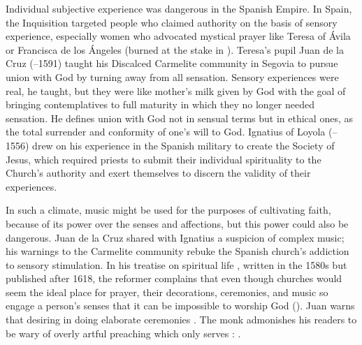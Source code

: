 Individual subjective experience was dangerous in the Spanish Empire.
In Spain, the Inquisition targeted people who claimed authority on the basis of
sensory experience, especially women who advocated mystical prayer like Teresa
of Ávila or Francisca de los Ángeles (burned at the stake in ).
    \Autocites
    {Ahlgren:TeresaPolitics}
    {Francisca:Inquisition}
    [, \XXX]{Schreiner:Certainty}
Teresa's pupil Juan de la Cruz (--1591) taught his Discalced
Carmelite community in Segovia to pursue union with God by turning away from
all sensation.
Sensory experiences were real, he taught, but they were like mother's milk
given by God with the goal of bringing contemplatives to full maturity in which
they no longer needed sensation.
He defines union with God not in sensual terms but in ethical ones, as the
total surrender and conformity of one's will to God.%
    \Autocite
    [, , ]
    {JuandelaCruz:Subida}
Ignatius of Loyola (--1556) drew on his experience in the Spanish
military to create the Society of Jesus, which required priests to submit their
individual spirituality to the Church's authority and exert themselves to
discern the validity of their experiences.

In such a climate, music might be used for the purposes of cultivating faith,
because of its power over the senses and affections, but this power could also
be dangerous.
Juan de la Cruz shared with Ignatius a suspicion of complex music; his
warnings to the Carmelite community rebuke the Spanish church's addiction to
sensory stimulation.
In his treatise on spiritual life , written
in the 1580s but published after 1618, the reformer complains that even though
churches would seem the ideal place for prayer, their decorations, ceremonies,
and music so engage a person's senses that it can be impossible to worship God
 ().
Juan warns that desiring  in doing
elaborate ceremonies .%
    \Autocite
    [, , ]
    {JuandelaCruz:Subida}
The monk admonishes his readers to be wary of overly artful preaching which
only serves :
.%
    \Autocite
    [, , ]
    {JuandelaCruz:Subida}

